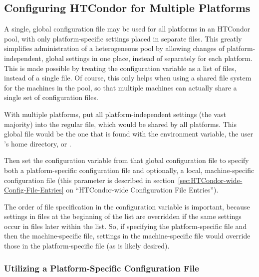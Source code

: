 \subsection{\label{sec:Multiple-Platforms}Configuring HTCondor for
Multiple Platforms} 

A single, global
configuration file may be used for all platforms in an HTCondor pool, with only
platform-specific settings placed in separate files.  This greatly
simplifies administration of a heterogeneous pool by allowing
changes of platform-independent, global settings in one place, instead of
separately for each platform.  This is made possible by treating the
 configuration variable as a
list of files, instead of a single file.  Of course, this only
helps when using a shared file system for the machines in the
pool, so that multiple machines can actually share a single set of
configuration files.

With multiple platforms, put all
platform-independent settings (the vast majority) into the regular
 file, which would be shared by all platforms.
This global file would be the one that is found with the
 environment variable, the user 's home
directory, or .

Then set the  configuration variable from that
global configuration file to specify both a platform-specific
configuration file and
optionally, a local, machine-specific configuration file (this parameter is
described in section~\ref{sec:HTCondor-wide-Config-File-Entries} on
``HTCondor-wide Configuration File Entries'').

The order of file specification in the
 configuration variable is important,
because settings
in files at the beginning of the list are overridden if the same
settings occur in files later within the list.  So, if specifying the
platform-specific file and then the machine-specific file, settings in
the machine-specific file would override those in the
platform-specific file (as is likely desired).  

\subsubsection{\label{sec:Specify-Platform-Files}Utilizing a
Platform-Specific Configuration File} 

